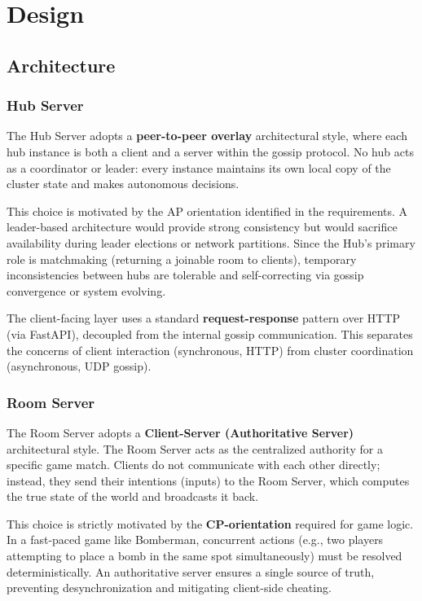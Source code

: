 \section{Design}\label{design}


\subsection{Architecture}\label{architecture}

\subsubsection{Hub Server}

The Hub Server adopts a \textbf{peer-to-peer overlay} architectural style, where each hub instance is both a client and a server within the gossip protocol.
No hub acts as a coordinator or leader: every instance maintains its own local copy of the cluster state and makes autonomous decisions.

This choice is motivated by the AP orientation identified in the requirements.
A leader-based architecture would provide strong consistency but would sacrifice availability during leader elections or network partitions.
Since the Hub's primary role is matchmaking (returning a joinable room to clients), temporary inconsistencies between hubs are tolerable and self-correcting via gossip convergence or system evolving.

The client-facing layer uses a standard \textbf{request-response} pattern over HTTP (via FastAPI), decoupled from the internal gossip communication.
This separates the concerns of client interaction (synchronous, HTTP) from cluster coordination (asynchronous, UDP gossip).

\subsubsection{Room Server}

The Room Server adopts a \textbf{Client-Server (Authoritative Server)} architectural style. 
The Room Server acts as the centralized authority for a specific game match. 
Clients do not communicate with each other directly; instead, they send their intentions (inputs) to the Room Server, which computes the true state of the world and broadcasts it back.

This choice is strictly motivated by the \textbf{CP-orientation} required for game logic. 
In a fast-paced game like Bomberman, concurrent actions (e.g., two players attempting to place a bomb in the same spot simultaneously) must be resolved deterministically.
An authoritative server ensures a single source of truth, preventing desynchronization and mitigating client-side cheating.

